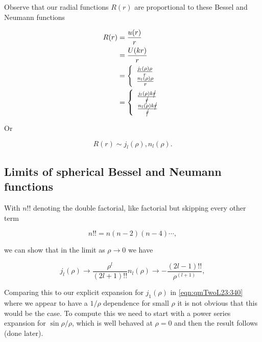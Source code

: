 Observe that our radial functions $R(r)$ are proportional to these Bessel and Neumann functions

\begin{align*}
R(r)
&= \frac{u(r)}{r}  \\
&= \frac{U(kr)}{r}  \\
&=
\left\{
\begin{array}{l}
\frac{j_l(\rho) \rho}{r} \\
\frac{n_l(\rho) \rho}{r}
\end{array}
\right. \\
&=
\left\{
\begin{array}{l}
\frac{j_l(\rho) k \cancel{r}}{\cancel{r}} \\
\frac{n_l(\rho) k \cancel{r}}{\cancel{r}}
\end{array}
\right.
\end{align*}

Or

\begin{equation}\label{eqn:qmTwoL23:360}
R(r) \sim j_l(\rho), n_l(\rho).
\end{equation}

\subsection{Limits of spherical Bessel and Neumann functions}

With $n!!$ denoting the double factorial, like factorial but skipping every other term

\begin{equation}\label{eqn:qmTwoL23:400}
n!! = n(n-2)(n-4) \cdots,
\end{equation}

we can show that in the limit as $\rho \rightarrow 0$ we have

\begin{subequations}
\label{eqn:qmTwoL23:380}
\begin{equation}\label{eqn:qmTwoL23:380a}
j_l(\rho) \rightarrow \frac{\rho^l}{(2 l + 1)!!} 
\end{equation}
\begin{equation}\label{eqn:qmTwoL23:380b}
n_l(\rho) \rightarrow -\frac{(2 l - 1)!!}{\rho^{(l+1)}},
\end{equation}
\end{subequations}

Comparing this to our explicit expansion for $j_1(\rho)$ in \ref{eqn:qmTwoL23:340} where we appear to have a $1/\rho$ dependence for small $\rho$ it is not obvious that this would be the case.  To compute this we need to start with a power series expansion for $\sin\rho/\rho$, which is well behaved at $\rho =0$ and then the result follows (done later).

